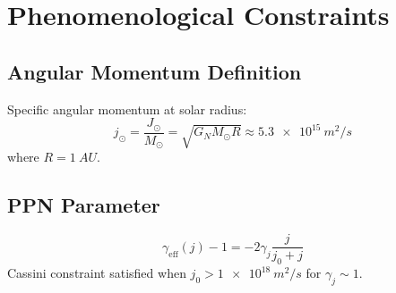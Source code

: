 \documentclass[aps,prd,twocolumn,superscriptaddress,nofootinbib,longbibliography]{revtex4-2}
\begin{document}
\section{Phenomenological Constraints}
\label{app:PPN}

\subsection{Angular Momentum Definition}
Specific angular momentum at solar radius:
\begin{equation}
j_\odot = \frac{J_\odot}{M_\odot} = \sqrt{G_N M_\odot R} \approx \SI{5.3e15}{m^2/s}
\end{equation}
where $R = \SI{1}{AU}$.

\subsection{PPN Parameter}
\begin{equation}
\gamma_{\text{eff}}(j) - 1 = -2\gamma_j \frac{j}{j_0 + j}
\end{equation}
Cassini constraint satisfied when $j_0 > \SI{1e18}{m^2/s}$ for $\gamma_j \sim 1$.



\end{document}
